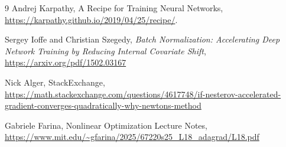 \begin{thebibliography}{9}
Andrej Karpathy, A Recipe for Training Neural Networks, \url{https://karpathy.github.io/2019/04/25/recipe/}.

Sergey Ioffe and Christian Szegedy, \emph{Batch Normalization: Accelerating Deep Network Training by Reducing Internal Covariate Shift}, \url{https://arxiv.org/pdf/1502.03167}

Nick Alger, StackExchange,
\url{https://math.stackexchange.com/questions/4617748/if-nesterov-accelerated-gradient-converges-quadratically-why-newtons-method}

Gabriele Farina, Nonlinear Optimization Lecture Notes, \url{https://www.mit.edu/~gfarina/2025/67220s25_L18_adagrad/L18.pdf}

\end{thebibliography}








